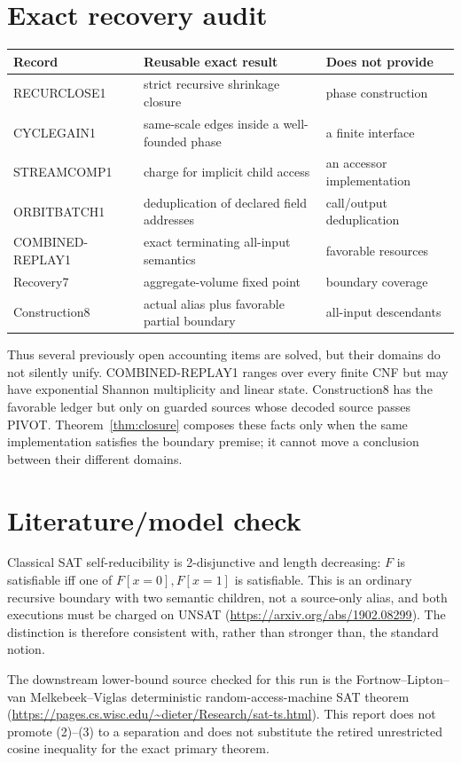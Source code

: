 \documentclass[11pt]{article}
\begin{document}
\section{Exact recovery audit}
\begin{center}
\begin{tabular}{@{}lll@{}}
\toprule
Record & Reusable exact result & Does not provide\\
\midrule
RECURCLOSE1 & strict recursive shrinkage closure & phase construction\\
CYCLEGAIN1 & same-scale edges inside a well-founded phase & a finite interface\\
STREAMCOMP1 & charge for implicit child access & an accessor implementation\\
ORBITBATCH1 & deduplication of declared field addresses & call/output deduplication\\
COMBINED-REPLAY1 & exact terminating all-input semantics & favorable resources\\
Recovery7 & aggregate-volume fixed point & boundary coverage\\
Construction8 & actual alias plus favorable partial boundary & all-input descendants\\
\bottomrule
\end{tabular}
\end{center}

Thus several previously open accounting items are solved, but their domains
do not silently unify.  COMBINED-REPLAY1 ranges over every finite CNF but may
have exponential Shannon multiplicity and linear state.  Construction8 has
the favorable ledger but only on guarded sources whose decoded source passes
PIVOT.  Theorem~\ref{thm:closure} composes these facts only when the same
implementation satisfies the boundary premise; it cannot move a conclusion
between their different domains.

\section{Literature/model check}
Classical SAT self-reducibility is 2-disjunctive and length decreasing:
$F$ is satisfiable iff one of $F[x=0],F[x=1]$ is satisfiable.  This is an
ordinary recursive boundary with two semantic children, not a source-only
alias, and both executions must be charged on UNSAT
(\url{https://arxiv.org/abs/1902.08299}).  The distinction is therefore
consistent with, rather than stronger than, the standard notion.

The downstream lower-bound source checked for this run is the
Fortnow--Lipton--van Melkebeek--Viglas deterministic random-access-machine
SAT theorem
(\url{https://pages.cs.wisc.edu/~dieter/Research/sat-ts.html}).
This report does not promote (2)--(3) to a separation and does not substitute
the retired unrestricted cosine inequality for the exact primary theorem.
\end{document}
